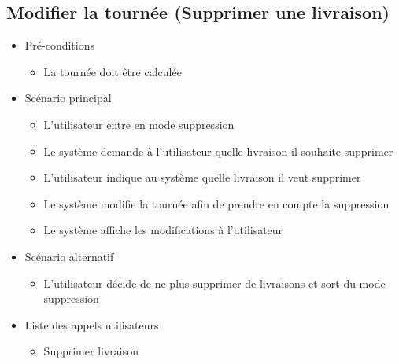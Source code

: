 \documentclass[10pt,a4paper]{book}
\begin{document}
\subsection{Modifier la tournée (Supprimer une livraison)}
\begin{itemize}
	\item{Pré-conditions}
	\begin{itemize}
		\item{La tournée doit être calculée}
	\end{itemize}
	\item{Scénario principal}
	\begin{itemize}
		\item{L'utilisateur entre en mode suppression}
		\item{Le système demande à l'utilisateur quelle livraison il souhaite supprimer}
		\item{L'utilisateur indique au système quelle livraison il veut supprimer}
		\item{Le système modifie la tournée afin de prendre en compte la suppression}
		\item{Le système affiche les modifications à l'utilisateur}
	\end{itemize}
	\item{Scénario alternatif}
	\begin{itemize}
			\item L'utilisateur décide de ne plus supprimer de livraisons et sort du mode suppression
		\end{itemize}
	
	\item{Liste des appels utilisateurs}
	\begin{itemize}
		\item{Supprimer livraison}
	\end{itemize}
\end{itemize}
\end{document}

